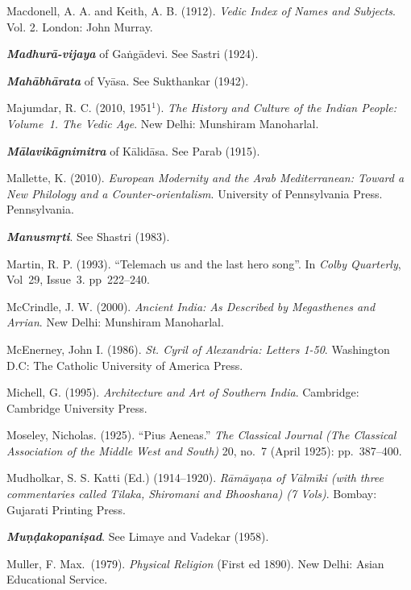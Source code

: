 \begin{thebibliography}{99}
Macdonell, A. A. and Keith, A. B. (1912). {\sl Vedic Index of Names and Subjects}. Vol. 2. London: John Murray.

{\sl\bfseries Madhurā-vijaya} of Gaṅgādevi. See Sastri (1924).

{\sl\bfseries Mahābhārata} of Vyāsa. See Sukthankar (1942).

Majumdar, R. C. (2010, 1951$^{1}$). {\sl The History and Culture of the Indian People: Volume~1. The Vedic Age}. New Delhi: Munshiram Manoharlal. 

{\sl\bfseries Mālavikāgnimitra} of Kālidāsa. See Parab (1915).

Mallette, K. (2010). {\sl European Modernity and the Arab Mediterranean: Toward a New Philology and a Counter-orientalism}. University of Pennsylvania Press. Pennsylvania.

{\sl\bfseries Manusmṛti}. See Shastri (1983).

Martin, R. P. (1993). “Telemach us and the last hero song”. In {\sl Colby Quarterly}, Vol~29, Issue~3. pp~222--240.

McCrindle, J. W. (2000). {\sl Ancient India: As Described by Megasthenes and Arrian}. New Delhi: Munshiram Manoharlal. 

McEnerney, John I. (1986). {\sl St. Cyril of Alexandria: Letters 1-50}. Washington D.C: The Catholic University of America Press. 

Michell, G. (1995). {\sl Architecture and Art of Southern India}. Cambridge: Cambridge University Press.

Moseley, Nicholas. (1925). “Pius Aeneas.” {\sl The Classical Journal (The Classical Association of the Middle West and South)} 20, no.~7 (April 1925): pp.~387--400.

Mudholkar, S. S. Katti (Ed.) (1914--1920). {\sl Rāmāyaṇa of Vālmīki (with three commentaries called Tilaka,    Shiromani and Bhooshana) (7 Vols)}. Bombay: Gujarati Printing Press. 

{\sl\bfseries Muṇḍakopaniṣad}. See Limaye and Vadekar (1958).

Muller, F. Max.\ (1979). {\sl Physical Religion} (First ed 1890). New Delhi: Asian Educational Service. 


\end{thebibliography}
